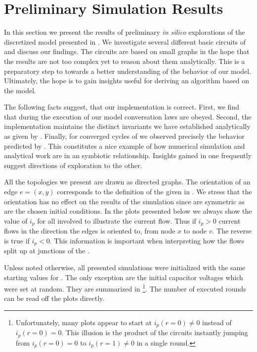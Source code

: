 

\section{Preliminary Simulation Results}

	In this section we present the results of preliminary \emph{in silico} explorations of the discretized model presented in . We investigate several different basic circuits of \Pes and discuss our findings. The circuits are based on small graphs in the hope that the results are not too complex yet to reason about them analytically. This is a preparatory step to towards a better understanding of the behavior of our model. Ultimately, the hope is to gain insights useful for deriving an algorithm based on the model.

	The following facts suggest, that our implementation is correct. First, we find that during the execution of our model conversation laws are obeyed. Second, the implementation maintains the distinct invariants we have established analytically as given by . Finally, for converged cycles of \Pes we observed precisely the behavior predicted by . This constitutes a nice example of how numerical simulation and analytical work are in an symbiotic relationship. Insights gained in one frequently suggest directions of exploration to the other. 

	All the topologies we present are drawn as directed graphs. The orientation of an edge $e = (x,y)$ corresponds to the definition of the \Pe given in . We stress that the orientation has no effect on the results of the simulation since \Pes are symmetric as are the chosen initial conditions. In the plots presented below we always show the value of $i_p$ for all involved \Pes to illustrate the current flow. Thus if $i_p > 0$ current flows in the direction the edges is oriented to, \ie from node $x$ to node $v$. The reverse is true if $i_p <0$. This information is important when interpreting how the flows split up at junctions of the \Pn.

	Unless noted otherwise, all presented simulations were initialized with the same starting values for \Pe. The only exception are the initial capacitor voltages which were set at random. They are summarized in \footnote{Unfortunately, many plots appear to start at $i_p(r=0) \neq 0$ instead of $i_p(r=0) = 0$. This illusion is the product of the circuits instantly jumping from $i_p(r=0) = 0$ to $i_p(r=1) \neq 0$ in a single round.}. The number of executed rounds can be read off the plots directly. 

